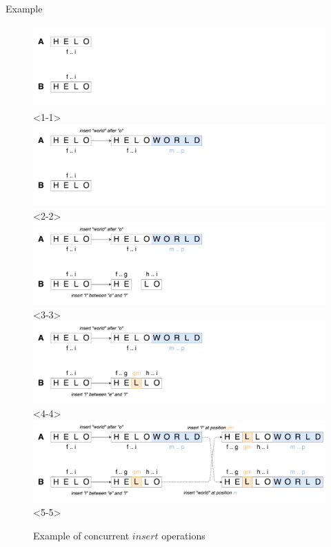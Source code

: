 \documentclass[10pt]{beamer}
\begin{document}
\begin{frame}{Example}
  \begin{figure}
    \includegraphics[scale=0.09]{img/initial-state.png}<1-1>
    \includegraphics[scale=0.09]{img/insert-world.png}<2-2>
    \includegraphics[scale=0.09]{img/insert-split.png}<3-3>
    \includegraphics[scale=0.09]{img/insert-l.png}<4-4>
    \includegraphics[scale=0.09]{img/final-state.png}<5-5>
    \caption{Example of concurrent $insert$ operations}
  \end{figure}
\end{frame}
\end{document}
